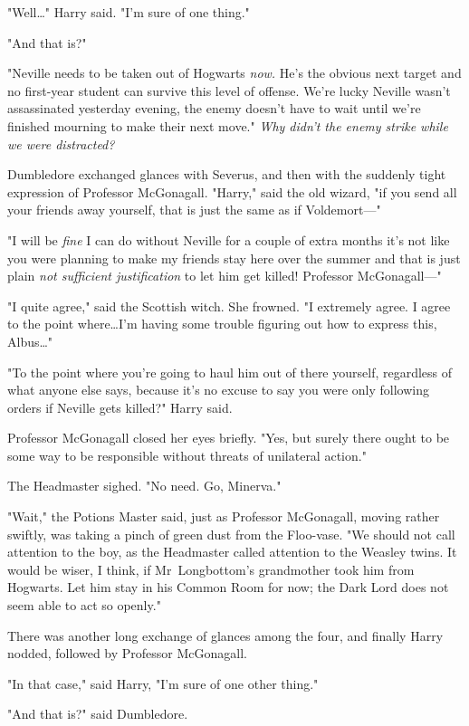 "Well…" Harry said. "I'm sure of one thing."

"And that is?"

"Neville needs to be taken out of Hogwarts \emph{now.} He's the obvious next
target and no first-year student can survive this level of offense. We're lucky
Neville wasn't assassinated yesterday evening, the enemy doesn't have to wait
until we're finished mourning to make their next move." \emph{Why didn't the
enemy strike while we were distracted?}

Dumbledore exchanged glances with Severus, and then with the suddenly tight
expression of Professor McGonagall. "Harry," said the old wizard, "if you send
all your friends away yourself, that is just the same as if Voldemort—"

"I will be \emph{fine} I can do without Neville for a couple of extra months
it's not like you were planning to make my friends stay here over the summer
and that is just plain \emph{not sufficient justification} to let him get
killed! Professor McGonagall—"

"I quite agree," said the Scottish witch. She frowned. "I extremely agree. I
agree to the point where…I'm having some trouble figuring out how to
express this, Albus…"

"To the point where you're going to haul him out of there yourself, regardless
of what anyone else says, because it's no excuse to say you were only following
orders if Neville gets killed?" Harry said.

Professor McGonagall closed her eyes briefly. "Yes, but surely there ought to
be some way to be responsible without threats of unilateral action."

The Headmaster sighed. "No need. Go, Minerva."

"Wait," the Potions Master said, just as Professor McGonagall, moving rather
swiftly, was taking a pinch of green dust from the Floo-vase. "We should not
call attention to the boy, as the Headmaster called attention to the Weasley
twins. It would be wiser, I think, if Mr~Longbottom's grandmother took him
from Hogwarts. Let him stay in his Common Room for now; the Dark Lord does not
seem able to act so openly."

There was another long exchange of glances among the four, and finally Harry
nodded, followed by Professor McGonagall.

"In that case," said Harry, "I'm sure of one other thing."

"And that is?" said Dumbledore.

